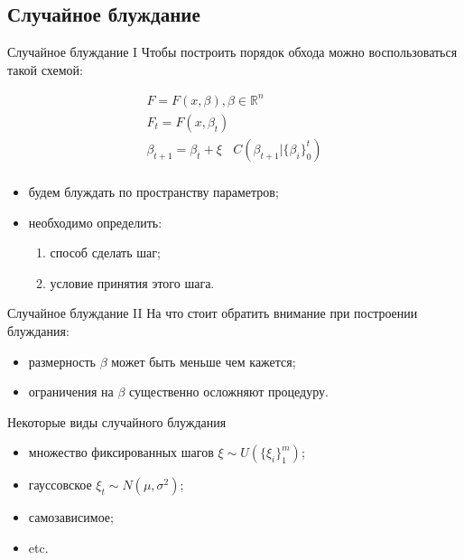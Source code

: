 \documentclass[14pt, fleqn, xcolor={dvipsnames, table}]{beamer}
\begin{document}
\subsection{Случайное блуждание}
\begin{frame}{Случайное блуждание I}
Чтобы построить порядок обхода можно воспользоваться такой схемой:

$$\begin{array}{l}
F = F(x, \beta), \beta \in \mathbb{R}^n \\
F_t = F(x, \beta_t) \\
\beta_{t+1} = \beta_t + \xi~~~~C(\beta_{t+1} | \{\beta_i\}_0^t) \\
\end{array}$$

\begin{itemize}
  \item будем блуждать по пространству параметров;
  \item необходимо определить:
  \begin{enumerate}
    \item способ сделать шаг;
    \item условие принятия этого шага.
  \end{enumerate}
\end{itemize}
\end{frame}

\begin{frame}{Случайное блуждание II}
На что стоит обратить внимание при построении блуждания:
\begin{itemize}
  \item размерность $\beta$ может быть меньше чем кажется;
  \item ограничения на $\beta$ существенно осложняют процедуру.
\end{itemize}
\end{frame}


\begin{frame}{Некоторые виды случайного блуждания}
\begin{itemize}
  \item множество фиксированных шагов $\xi \sim U(\{\xi_i\}_1^m)$;
  \item гауссовское $\xi_t \sim N(\mu, \sigma^2)$;
  \item самозависимое;
  \item etc.
\end{itemize}
\end{frame}
\end{document}

